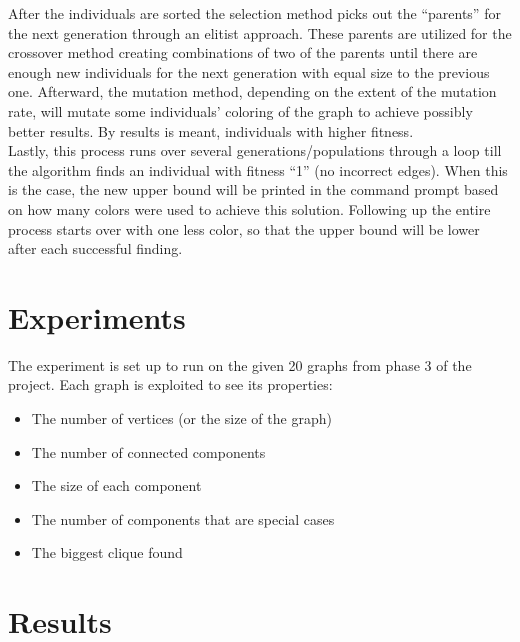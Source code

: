 \documentclass[a4paper]{report}
\begin{document}
		After the individuals are sorted the selection method picks out the “parents” for the next generation through an elitist approach. These parents are utilized for the crossover method creating combinations of two of the parents until there are enough new individuals for the next generation with equal size to the previous one. Afterward, the mutation method, depending on the extent of the mutation rate, will mutate some individuals’ coloring of the graph to achieve possibly better results. By results is meant, individuals with higher fitness.
\\
		
		Lastly, this process runs over several generations/populations through a loop till the algorithm finds an individual with fitness “1” (no incorrect edges). When this is the case, the new upper bound will be printed in the command prompt based on how many colors were used to achieve this solution. Following up the entire process starts over with one less color, so that the upper bound will be lower after each successful finding.
		
		
		
	\chapter{Experiments}
	The experiment is set up to run on the given 20 graphs from phase 3 of the project. Each graph is exploited to see its properties:
	\begin{itemize}
		\item The number of vertices (or the size of the graph)
		\item The number of connected components
		\item The size of each component
		\item The number of components that are special cases
		\item The biggest clique found
	\end{itemize}

	\chapter{Results}
\end{document}
